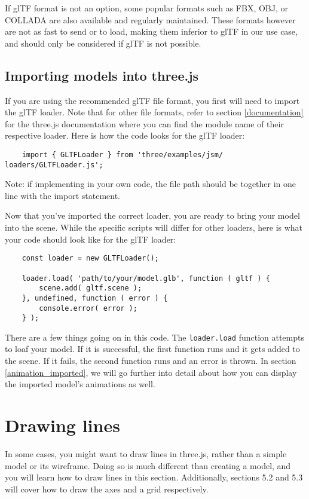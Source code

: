 \documentclass[10pt,final,journal,compsoc]{IEEEtran}
\begin{document}
    If glTF format is not an option, some popular formats such as FBX, OBJ, or COLLADA are also available and regularly maintained. These formats however are not as fast to send or to load, making them inferior to glTF in our use case, and should only be considered if glTF is not possible.

    \subsection{Importing models into three.js} \label{importing_models}
    If you are using the recommended glTF file format, you first will need to import the glTF loader. Note that for other file formats, refer to section \ref{documentation} for the three.js documentation where you can find the module name of their respective loader. Here is how the code looks for the glTF loader:
    
    \begin{lstlisting}
    import { GLTFLoader } from 'three/examples/jsm/ loaders/GLTFLoader.js';
    \end{lstlisting}
    
    Note: if implementing in your own code, the file path should be together in one line with the import statement.
    
    Now that you've imported the correct loader, you are ready to bring your model into the scene. While the specific scripts will differ for other loaders, here is what your code should look like for the glTF loader:
    
    \begin{lstlisting}
    const loader = new GLTFLoader();
    
    loader.load( 'path/to/your/model.glb', function ( gltf ) {
        scene.add( gltf.scene );
    }, undefined, function ( error ) {
        console.error( error );
    } );
    \end{lstlisting}
    
    There are a few things going on in this code. The \verb|loader.load| function attempts to loaf your model. If it is successful, the first function runs and it gets added to the scene. If it fails, the second function runs and an error is thrown. In section \ref{animation_imported}, we will go further into detail about how you can display the imported model's animations as well.



\section{Drawing lines}
In some cases, you might want to draw lines in three.js, rather than a simple model or its wireframe. Doing so is much different than creating a model, and you will learn how to draw lines in this section. Additionally, sections 5.2 and 5.3 will cover how to draw the axes and a grid respectively.
\end{document}
